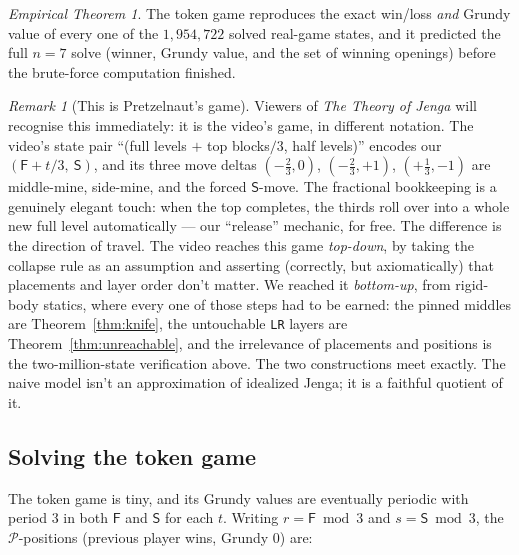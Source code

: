 \documentclass[11pt]{article}
\theoremstyle{definition}
\theoremstyle{remark}
\newtheorem{remark}[theorem]{Remark}
\newtheorem*{empirical}{Empirical Theorem}
\newcommand{\Fq}{\mathsf{F}}
\newcommand{\Sq}{\mathsf{S}}
\newcommand{\layer}[1]{\texttt{#1}}
\begin{document}
\begin{empirical}
The token game reproduces the exact win/loss \emph{and} Grundy value of
every one of the $1{,}954{,}722$ solved real-game states, and it predicted
the full $n=7$ solve (winner, Grundy value, and the set of winning
openings) before the brute-force computation finished.
\end{empirical}

\begin{remark}[This is Pretzelnaut's game]\label{rem:pretzelnaut}
Viewers of \emph{The Theory of Jenga} will recognise this immediately: it
is the video's game, in different notation. The video's state pair
``(full levels $+$ top blocks$/3$, half levels)'' encodes our
$(\Fq + t/3,\ \Sq)$, and its three move deltas $(-\tfrac23, 0)$,
$(-\tfrac23, +1)$, $(+\tfrac13, -1)$ are middle-mine, side-mine, and the
forced $\Sq$-move. The fractional bookkeeping is a genuinely elegant touch:
when the top completes, the thirds roll over into a whole new full level
automatically --- our ``release'' mechanic, for free. The difference is the
direction of travel. The video reaches this game \emph{top-down}, by taking
the collapse rule as an assumption and asserting (correctly, but
axiomatically) that placements and layer order don't matter. We reached it
\emph{bottom-up}, from rigid-body statics, where every one of those steps
had to be earned: the pinned middles are Theorem~\ref{thm:knife}, the
untouchable \layer{LR} layers are Theorem~\ref{thm:unreachable}, and the
irrelevance of placements and positions is the two-million-state
verification above. The two constructions meet exactly. The naive model
isn't an approximation of idealized Jenga; it is a faithful quotient of it.
\end{remark}

\subsection{Solving the token game}

The token game is tiny, and its Grundy values are eventually periodic with
period $3$ in both $\Fq$ and $\Sq$ for each $t$. Writing $r = \Fq \bmod 3$
and $s = \Sq \bmod 3$, the $\mathcal{P}$-positions (previous player wins,
Grundy $0$) are:
\end{document}
